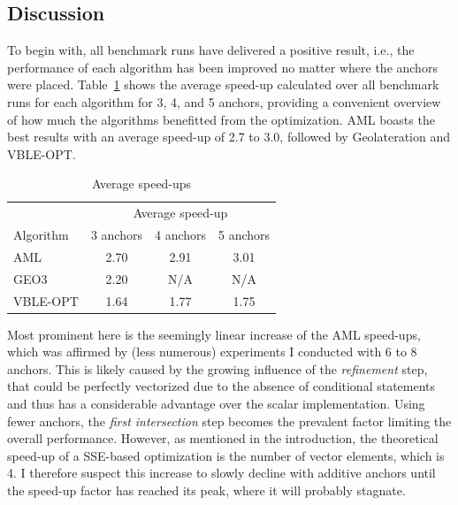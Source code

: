 \subsection{Discussion}
To begin with, all benchmark runs have delivered a positive result, i.e., the performance of each algorithm has been improved no matter where the anchors were placed. Table~\ref{average_table} shows the average speed-up calculated over all benchmark runs for each algorithm for 3, 4, and 5 anchors, providing a convenient overview of how much the algorithms benefitted from the optimization. AML boasts the best results with an average speed-up of 2.7 to 3.0, followed by Geolateration and VBLE-OPT.

\begin{table}[ht]
\begin{center}
\caption{Average speed-ups}
\begin{tabular}{lccc} 
\toprule
& \multicolumn{3}{c}{Average speed-up} \\ 
\cmidrule(r){2-4}
Algorithm & 3 anchors & 4 anchors & 5 anchors \\
\midrule
AML & 2.70 & 2.91 & 3.01 \\
GEO3 & 2.20 & N/A & N/A \\ 
VBLE-OPT & 1.64 & 1.77& 1.75 \\
\bottomrule
\end{tabular}
\label{average_table}
\end{center}
\end{table}

Most prominent here is the seemingly linear increase of the AML speed-ups, which was affirmed by (less numerous) experiments I conducted with 6 to 8 anchors. This is likely caused by the growing influence of the \emph{refinement} step, that could be perfectly vectorized due to the absence of conditional statements and thus has a considerable advantage over the scalar implementation. Using fewer anchors, the \emph{first intersection} step becomes the prevalent factor limiting the overall performance. However, as mentioned in the introduction, the theoretical speed-up of a SSE-based optimization is the number of vector elements, which is 4. I therefore suspect this increase to slowly decline with additive anchors until the speed-up factor has reached its peak, where it will probably stagnate.

